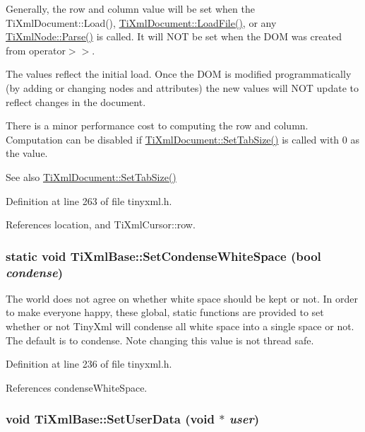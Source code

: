 Generally, the row and column value will be set when the TiXmlDocument::Load(), \hyperlink{class_ti_xml_document_a4c852a889c02cf251117fd1d9fe1845f}{TiXmlDocument::LoadFile()}, or any \hyperlink{class_ti_xml_base_a00e4edb0219d00a1379c856e5a1d2025}{TiXmlNode::Parse()} is called. It will NOT be set when the DOM was created from operator$>$$>$.

The values reflect the initial load. Once the DOM is modified programmatically (by adding or changing nodes and attributes) the new values will NOT update to reflect changes in the document.

There is a minor performance cost to computing the row and column. Computation can be disabled if \hyperlink{class_ti_xml_document_a51dac56316f89b35bdb7d0d433ba988e}{TiXmlDocument::SetTabSize()} is called with 0 as the value.

\begin{DoxySeeAlso}{See also}
\hyperlink{class_ti_xml_document_a51dac56316f89b35bdb7d0d433ba988e}{TiXmlDocument::SetTabSize()} 
\end{DoxySeeAlso}


Definition at line 263 of file tinyxml.h.

References location, and TiXmlCursor::row.\hypertarget{class_ti_xml_base_a0f799ec645bfb8d8a969e83478f379c1}{
\subsubsection[{SetCondenseWhiteSpace}]{\setlength{\rightskip}{0pt plus 5cm}static void TiXmlBase::SetCondenseWhiteSpace (bool {\em condense})}}
\label{class_ti_xml_base_a0f799ec645bfb8d8a969e83478f379c1}
The world does not agree on whether white space should be kept or not. In order to make everyone happy, these global, static functions are provided to set whether or not TinyXml will condense all white space into a single space or not. The default is to condense. Note changing this value is not thread safe. 

Definition at line 236 of file tinyxml.h.

References condenseWhiteSpace.\hypertarget{class_ti_xml_base_ac6b3e0f790930d4970ec30764e937b5d}{
\subsubsection[{SetUserData}]{\setlength{\rightskip}{0pt plus 5cm}void TiXmlBase::SetUserData (void $\ast$ {\em user})}}
\label{class_ti_xml_base_ac6b3e0f790930d4970ec30764e937b5d}


